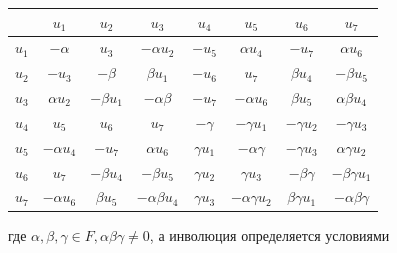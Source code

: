 \documentclass[10pt]{article}
\begin{document}
\begin{center}

\begin{tabular}{c|c|c|c|c|c|c|c}

\hline

 & $u_{1}$ & $u_{2}$ & $u_{3}$ & $u_{4}$ & $u_{5}$ & $u_{6}$ & $u_{7}$ \\

\hline

$u_{1}$ & $-\alpha$ & $u_{3}$ & $-\alpha u_{2}$ & $-u_{5}$ & $\alpha u_{4}$ & $-u_{7}$ & $\alpha u_{6}$ \\

\hline

$u_{2}$ & $-u_{3}$ & $-\beta$ & $\beta u_{1}$ & $-u_{6}$ & $u_{7}$ & $\beta u_{4}$ & $-\beta u_{5}$ \\

\hline

$u_{3}$ & $\alpha u_{2}$ & $-\beta u_{1}$ & $-\alpha \beta$ & $-u_{7}$ & $-\alpha u_{6}$ & $\beta u_{5}$ & $\alpha \beta u_{4}$ \\

\hline

$u_{4}$ & $u_{5}$ & $u_{6}$ & $u_{7}$ & $-\gamma$ & $-\gamma u_{1}$ & $-\gamma u_{2}$ & $-\gamma u_{3}$ \\

\hline

$u_{5}$ & $-\alpha u_{4}$ & $-u_{7}$ & $\alpha u_{6}$ & $\gamma u_{1}$ & $-\alpha \gamma$ & $-\gamma u_{3}$ & $\alpha \gamma u_{2}$ \\

\hline

$u_{6}$ & $u_{7}$ & $-\beta u_{4}$ & $-\beta u_{5}$ & $\gamma u_{2}$ & $\gamma u_{3}$ & $-\beta \gamma$ & $-\beta \gamma u_{1}$ \\

\hline

$u_{7}$ & $-\alpha u_{6}$ & $\beta u_{5}$ & $-\alpha \beta u_{4}$ & $\gamma u_{3}$ & $-\alpha \gamma u_{2}$ & $\beta \gamma u_{1}$ & $-\alpha \beta \gamma$ \\

\hline

\end{tabular}

\end{center}



где $\alpha, \beta, \gamma \in F, \alpha \beta \gamma \neq 0$, а инволюция определяется условиями
\end{document}
